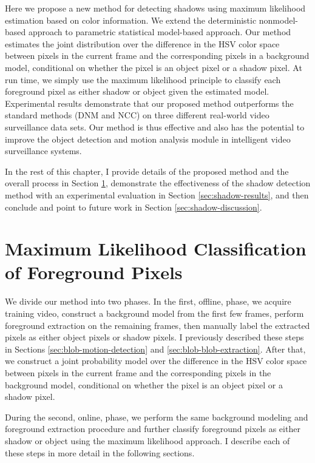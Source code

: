 Here we propose a new method for detecting shadows using maximum
likelihood estimation based on color information.  We extend the
deterministic nonmodel-based approach to parametric statistical
model-based approach. Our method estimates the joint distribution over
the difference in the HSV color space between pixels in the current
frame and the corresponding pixels in a background model, conditional
on whether the pixel is an object pixel or a shadow pixel. At run
time, we simply use the maximum likelihood principle to classify each
foreground pixel as either shadow or object given the estimated model.
Experimental results demonstrate that our proposed method outperforms
the standard methods (DNM and NCC) on three different real-world video
surveillance data sets. Our method is thus effective and also has the
potential to improve the object detection and motion analysis module
in intelligent video surveillance systems.

In the rest of this chapter, I provide details of the proposed method
and the overall process in Section \ref{sec:shadow-algorithm},
demonstrate the effectiveness of the shadow detection method with an
experimental evaluation in Section \ref{sec:shadow-results}, and then
conclude and point to future work in
Section \ref{sec:shadow-discussion}.

\section{Maximum Likelihood Classification of Foreground Pixels}
\label{sec:shadow-algorithm}

We divide our method into two phases.  In the first, offline, phase, we
acquire training video, construct a background model from the first
few frames, perform foreground extraction on the remaining frames,
then manually label the extracted pixels as either object pixels or
shadow pixels.  I previously described these steps in
Sections \ref{sec:blob-motion-detection}
and \ref{sec:blob-blob-extraction}. After that, we construct a joint
probability model over the difference in the HSV color space between
pixels in the current frame and the corresponding pixels in the
background model, conditional on whether the pixel is an object pixel
or a shadow pixel.

During the second, online, phase, we perform the same background
modeling and foreground extraction procedure and further classify
foreground pixels as either shadow or object using the maximum
likelihood approach. I describe each of these steps in more detail in
the following sections.

